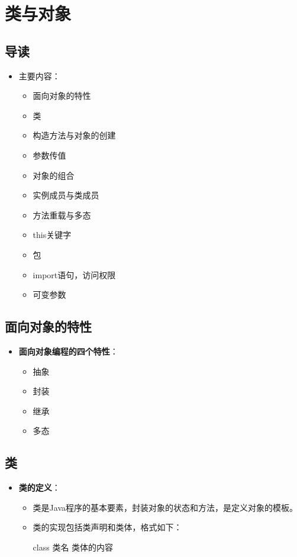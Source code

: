 \documentclass[a4paper, 10pt]{ctexart}
\begin{document}
\section{类与对象}

\subsection{导读}
\begin{itemize}
  \item 主要内容：
  \begin{itemize}
    \item 面向对象的特性
    \item 类
    \item 构造方法与对象的创建
    \item 参数传值
    \item 对象的组合
    \item 实例成员与类成员
    \item 方法重载与多态
    \item this关键字
    \item 包
    \item import语句，访问权限
    \item 可变参数
  \end{itemize}
\end{itemize}

\subsection{面向对象的特性}
\begin{itemize}
  \item \textbf{面向对象编程的四个特性}：
  \begin{itemize}
    \item 抽象
    \item 封装
    \item 继承
    \item 多态
  \end{itemize}
\end{itemize}

\subsection{类}
\begin{itemize}
  \item \textbf{类的定义}：
  \begin{itemize}
    \item 类是Java程序的基本要素，封装对象的状态和方法，是定义对象的模板。
    \item 类的实现包括类声明和类体，格式如下：
    \begin{codeblock}
class 类名 {
    类体的内容
}
    \end{codeblock}
  \end{itemize}
\end{itemize}
\end{document}
